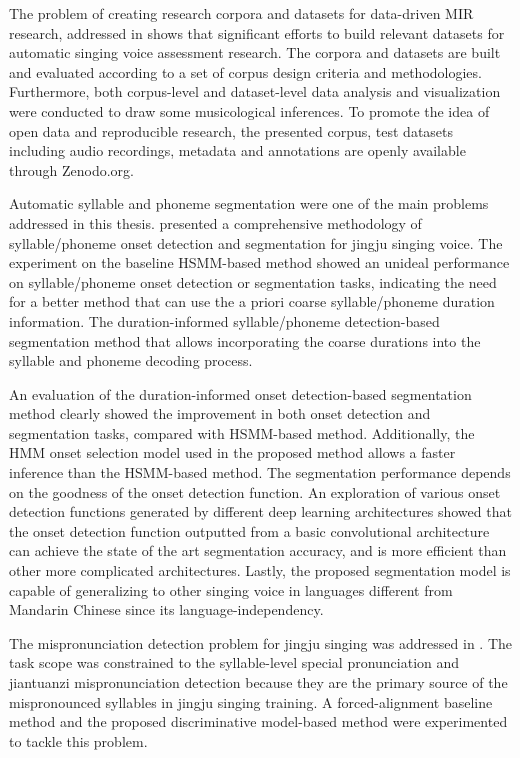 The problem of creating research corpora and datasets for data-driven \gls{MIR} research, addressed in  shows that significant efforts to build relevant datasets for automatic singing voice assessment research. The corpora and datasets are built and evaluated according to a set of corpus design criteria and methodologies. Furthermore, both corpus-level and dataset-level data analysis and visualization were conducted to draw some musicological inferences. To promote the idea of open data and reproducible research, the presented corpus, test datasets including audio recordings, metadata and annotations are openly available through Zenodo.org.

Automatic syllable and phoneme segmentation were one of the main problems addressed in this thesis.  presented a comprehensive methodology of syllable/phoneme onset detection and segmentation for jingju singing voice. The experiment on the baseline \gls{HSMM}-based method showed an unideal performance on syllable/phoneme onset detection or segmentation tasks, indicating the need for a better method that can use the a priori coarse syllable/phoneme duration information. The duration-informed syllable/phoneme detection-based segmentation method that allows incorporating the coarse durations into the syllable and phoneme decoding process.

An evaluation of the duration-informed onset detection-based segmentation method clearly showed the improvement in both onset detection and segmentation tasks, compared with \gls{HSMM}-based method. Additionally, the \gls{HMM} onset selection model used in the proposed method allows a faster inference than the \gls{HSMM}-based method. The segmentation performance depends on the goodness of the onset detection function. An exploration of various onset detection functions generated by different deep learning architectures showed that the onset detection function outputted from a basic convolutional architecture can achieve the state of the art segmentation accuracy, and is more efficient than other more complicated architectures. Lastly, the proposed segmentation model is capable of generalizing to other singing voice in languages different from Mandarin Chinese since its language-independency.

The mispronunciation detection problem for jingju singing was addressed in . The task scope was constrained to the syllable-level special pronunciation and \gls{jiantuanzi} mispronunciation detection because they are the primary source of the mispronounced syllables in jingju singing training. A forced-alignment baseline method and the proposed discriminative model-based method were experimented to tackle this problem.

